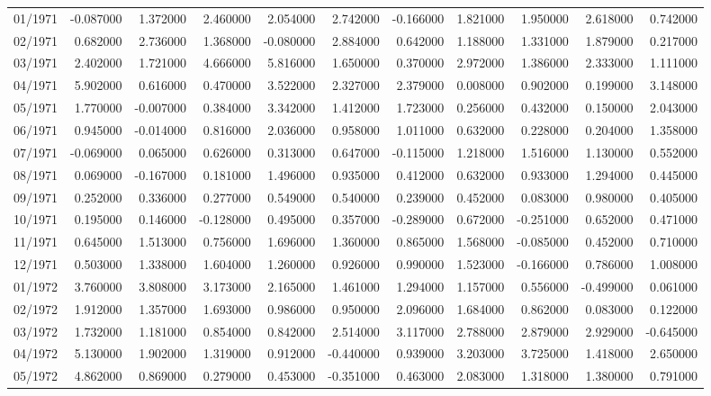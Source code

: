 \begin{tabular}{lrrrrrrrrrr}
01/1971 & -0.087000 & 1.372000 & 2.460000 & 2.054000 & 2.742000 & -0.166000 & 1.821000 & 1.950000 & 2.618000 & 0.742000 \\
02/1971 & 0.682000 & 2.736000 & 1.368000 & -0.080000 & 2.884000 & 0.642000 & 1.188000 & 1.331000 & 1.879000 & 0.217000 \\
03/1971 & 2.402000 & 1.721000 & 4.666000 & 5.816000 & 1.650000 & 0.370000 & 2.972000 & 1.386000 & 2.333000 & 1.111000 \\
04/1971 & 5.902000 & 0.616000 & 0.470000 & 3.522000 & 2.327000 & 2.379000 & 0.008000 & 0.902000 & 0.199000 & 3.148000 \\
05/1971 & 1.770000 & -0.007000 & 0.384000 & 3.342000 & 1.412000 & 1.723000 & 0.256000 & 0.432000 & 0.150000 & 2.043000 \\
06/1971 & 0.945000 & -0.014000 & 0.816000 & 2.036000 & 0.958000 & 1.011000 & 0.632000 & 0.228000 & 0.204000 & 1.358000 \\
07/1971 & -0.069000 & 0.065000 & 0.626000 & 0.313000 & 0.647000 & -0.115000 & 1.218000 & 1.516000 & 1.130000 & 0.552000 \\
08/1971 & 0.069000 & -0.167000 & 0.181000 & 1.496000 & 0.935000 & 0.412000 & 0.632000 & 0.933000 & 1.294000 & 0.445000 \\
09/1971 & 0.252000 & 0.336000 & 0.277000 & 0.549000 & 0.540000 & 0.239000 & 0.452000 & 0.083000 & 0.980000 & 0.405000 \\
10/1971 & 0.195000 & 0.146000 & -0.128000 & 0.495000 & 0.357000 & -0.289000 & 0.672000 & -0.251000 & 0.652000 & 0.471000 \\
11/1971 & 0.645000 & 1.513000 & 0.756000 & 1.696000 & 1.360000 & 0.865000 & 1.568000 & -0.085000 & 0.452000 & 0.710000 \\
12/1971 & 0.503000 & 1.338000 & 1.604000 & 1.260000 & 0.926000 & 0.990000 & 1.523000 & -0.166000 & 0.786000 & 1.008000 \\
01/1972 & 3.760000 & 3.808000 & 3.173000 & 2.165000 & 1.461000 & 1.294000 & 1.157000 & 0.556000 & -0.499000 & 0.061000 \\
02/1972 & 1.912000 & 1.357000 & 1.693000 & 0.986000 & 0.950000 & 2.096000 & 1.684000 & 0.862000 & 0.083000 & 0.122000 \\
03/1972 & 1.732000 & 1.181000 & 0.854000 & 0.842000 & 2.514000 & 3.117000 & 2.788000 & 2.879000 & 2.929000 & -0.645000 \\
04/1972 & 5.130000 & 1.902000 & 1.319000 & 0.912000 & -0.440000 & 0.939000 & 3.203000 & 3.725000 & 1.418000 & 2.650000 \\
05/1972 & 4.862000 & 0.869000 & 0.279000 & 0.453000 & -0.351000 & 0.463000 & 2.083000 & 1.318000 & 1.380000 & 0.791000 \\

\end{tabular}
